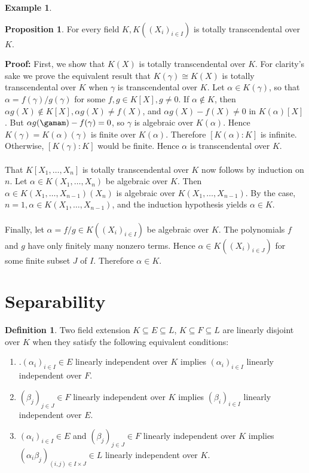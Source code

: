 \documentclass[11pt]{amsbook}%
\newcommand{\ii}{\item}
\theoremstyle{plain}
\theoremstyle{definition}
\newtheorem{definition*}{Definition}
\newtheorem*{example*}{Example}
\newtheorem{proposition*}{Proposition}
\numberwithin{equation}{section}
\renewcommand{\proof}{ \textbf{Proof: }}
\begin{document}
\begin{example*}
\begin{proposition*}
  For every field $K, K((X_{i})_{i \in I})$ is totally transcendental over $K$.
\end{proposition*} \vspace{1.8em}
\proof First, we show that $K(X)$ is totally transcendental over $K$. For clarity's
sake we prove the equivalent result that $K(\gamma) \cong K(X)$ is totally transcendental
over $K$ when $\gamma$ is transcendental over $K$. Let $\alpha \in K(\gamma)$, so that $\alpha = f(\gamma)/g(\gamma)$
for some $f, g \in K[X], g \neq 0$. If $\alpha \notin K$, then $\alpha g(X) \notin K[X], \alpha g(X) \neq f(X)$,
and $\alpha g(X) - f(X) \neq 0$ in $K(\alpha)[X]$. But $\alpha g(\gamam) - f(\gamma) = 0$, so
$\gamma$ is algebraic over $K(\alpha)$. Hence $K(\gamma) = K(\alpha)(\gamma)$ is finite
over $K(\alpha)$. Therefore $[K(\alpha):K]$ is infinite. Otherwise, $[K(\gamma):K]$
would be finite. Hence $\alpha$ is transcendental over $K$. \\ \\
That $K[X_{1}, \dots, X_{n}]$ is totally transcendental over $K$ now follows by
induction on $n$. Let $\alpha \in K(X_{1}, \dots, X_{n})$ be algebraic over $K$.
Then $\alpha \in K(X_{1}, \dots, X_{n-1})(X_{n})$ is algebraic over $K(X_{1}, \dots, X_{n-1})$.
By the case, $n=1, \alpha \in K(X_{1}, \dots, X_{n-1})$, and the
induction hypothesis yields $\alpha \in K$. \\ \\
Finally, let $\alpha = f/g \in K((X_{i})_{i \in I})$ be algebraic over $K$. The
polynomials $f$ and $g$ have only finitely many nonzero terms. Hence
$\alpha \in K ((X_{i})_{i \in J})$ for some finite subset $J$ of $I$. Therefore $\alpha \in K$. \qedsymbol

\section{Separability}

\begin{definition*}
  Two field extension $K \subseteq E \subseteq L$, $K \subseteq F \subseteq L$ are linearly disjoint
  over $K$ when they satisfy the following equivalent conditions:
  \begin{enumerate}[1. ]
      \ii.$(\alpha_{i})_{i \in I} \in E$ linearly independent over $K$ implies
      $(\alpha_{i})_{i \in I}$ linearly independent over $F$.
      \ii $(\beta_{j})_{j \in J} \in F$ linearly independent over $K$ implies
      $(\beta_{i})_{i \in I}$ linearly independent over $E$.
      \ii $(\alpha_{i})_{i \in I} \in E$ and $(\beta_{j})_{j \in J} \in F$ linearly
      independent over $K$ implies $(\alpha_{i}\beta_{j})_{(i, j) \in I \times J} \in L$
      linearly independent over $K$.
  \end{enumerate}
\end{definition*}


\end{example*}
\end{document}
